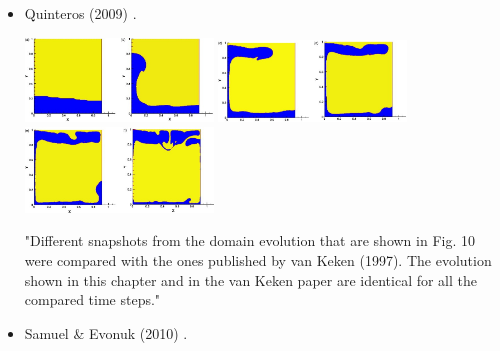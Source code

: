 \begin{itemize}
\item Quinteros \etal (2009) \cite{qurj09}.

\begin{center}
\includegraphics[width=5cm]{images/benchmark_vaks97/qurj09_a}
\includegraphics[width=5cm]{images/benchmark_vaks97/qurj09_b}
\includegraphics[width=5cm]{images/benchmark_vaks97/qurj09_c}
\end{center}

"Different snapshots from the domain evolution that are shown in Fig. 10 were compared with the 
ones published by van Keken \etal (1997). The evolution shown in this chapter and 
in the van Keken paper are identical for all the compared time steps."

\item Samuel \& Evonuk (2010) \cite{saev10}.


\end{itemize}
